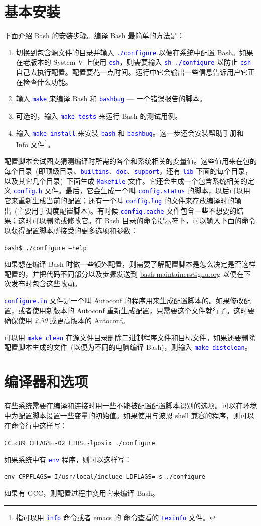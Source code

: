 \documentclass[openany,notitlepage]{book}
\newcommand{\codeblock}[1]{\begin{center}\begin{minipage}{.7\textwidth}{\tt #1}\end{minipage}\end{center}}
\newcommand{\codeIdentifier}[1]{\textcolor[RGB]{0,255,255}{\texttt{#1}}}
\newcommand{\codeSpecial}[1]{\textcolor[RGB]{255,20,147}{\texttt{#1}}}
\newcommand{\codeStatement}[1]{\textcolor[RGB]{0,0,255}{\texttt{#1}}}
\newcommand{\code}[1]{\textcolor{blue}{{\tt #1}}}
\newcommand{\hl}[1]{{\sl #1}}
\begin{document}
\begin{CJK}{UTF8}{song}
\section{基本安装} %
下面介绍 Bash 的安装步骤。编译 Bash 最简单的方法是：
\begin{enumerate}
    \item 切换到包含源文件的目录并输入 \code{./configure} 以便在系统中配置 Bash。如果在老版本的 System V 上使用 \code{csh}，则需要输入 \code{sh ./configure} 以防止 \code{csh} 自己去执行配置。配置要花一点时间。运行中它会输出一些信息告诉用户它正在检查什么功能。
    \item 输入 \code{make} 来编译 Bash 和 \code{bashbug} --- 一个错误报告的脚本。
    \item 可选的，输入 \code{make tests} 来运行 Bash 的测试用例。
    \item 输入 \code{make install} 来安装 \code{bash} 和 \code{bashbug}。这一步还会安装帮助手册和 Info 文件\footnote{指可以用 \code{info} 命令或者 emacs 的  命令查看的 \code{texinfo} 文件。}。
\end{enumerate}
配置脚本会试图支猜测编译时所需的各个和系统相关的变量值。这些值用来在包的每个目录~(即顶级目录、\code{builtins}、\code{doc}、\code{support}，还有 \code{lib} 下面的每个目录，以及其它几个目录)~下面生成 \code{Makefile} 文件。它还会生成一个包含系统相关的定义 \code{config.h} 文件。最后，它会生成一个叫 \code{config.status} 的脚本，以后可以用它来重新生成当前的配置；还有一个叫 \code{config.log} 的文件来存放编译时的输出~(主要用于调度配置脚本)。有时候 \code{config.cache} 文件包含一些不想要的结果；这时可以删除或修改它。在 Bash 目录的命令提示符下，可以输入下面的命令以获得配置脚本所接受的更多选项和参数：
    \codeblock{bash\$ ./configure \codeSpecial{--help}}

如果想在编译 Bash 时做一些额外配置，则需要了解配置脚本是怎么决定是否这样配置的，并把代码不同部分以及步骤发送到 \href{mailto:bash-maintainers@gnu.org}{bash-maintainers@gnu.org} 以便在下次发布时包含这些改动。

\code{configure.in} 文件是一个叫 Autoconf 的程序用来生成配置脚本的。如果修改配置，或者使用新版本的 Autoconf 重新生成配置，只需要这个文件就行了。这时要确保使用 \hl{2.50} 或更高版本的 Autoconf。

可以用 \code{make clean} 在源文件目录删除二进制程序文件和目标文件。如果还要删除配置脚本生成的文件~(以便为不同的电脑编译 Bash)，则输入 \code{make distclean}。

\section{编译器和选项} %
有些系统需要在编译和连接时用一些不能被配置配置脚本识别的选项。可以在环境中为配置脚本设置一些变量的初始值。如果使用与波恩 shell 兼容的程序，则可以在命令行中这样写：
    \codeblock{\codeIdentifier{CC}=c89 \codeIdentifier{CFLAGS}=-O2 \codeIdentifier{LIBS}=-lposix ./configure}
如果系统中有 \code{env} 程序，则可以这样写：
    \codeblock{\codeStatement{env} \codeIdentifier{CPPFLAGS}=-I/usr/\codeStatement{local}/include \codeIdentifier{LDFLAGS}=-s ./configure}
如果有 GCC，则配置过程中变用它来编译 Bash。


\end{CJK}
\end{document}
